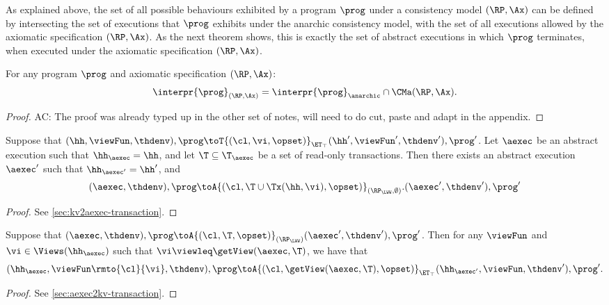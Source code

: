 As explained above, the set of all possible behaviours exhibited by a program $\prog$ under a 
consistency model $(\RP, \Ax)$ can be defined by intersecting the set of executions 
that $\prog$ exhibits under the anarchic consistency model, with the set of all executions 
allowed by the axiomatic specification $(\RP, \Ax)$. As the next theorem shows, 
this is exactly the set of abstract executions in which $\prog$ terminates, 
when executed under the axiomatic specification $(\RP, \Ax)$.

\begin{theorem}
For any program $\prog$ and axiomatic specification $(\RP, \Ax)$:
\[
\interpr{\prog}_{(\RP, \Ax)} = \interpr{\prog}_{\anarchic} \cap \CMa(\RP, \Ax). 
\]
\end{theorem}
\begin{proof}
AC: The proof was already typed up in the other set of notes, will need to do 
cut, paste and adapt in the appendix.
\end{proof}



\begin{proposition}
\label{prop:kv2aexec_transition}
Suppose that $(\hh, \viewFun, \thdenv), \prog \toT{(\cl, \vi, \opset)}_{\ET_{\top}} (\hh', 
\viewFun', \thdenv'), \prog'$. Let $\aexec$ be an abstract execution 
such that $\hh_{\aexec} = \hh$, and let $\T \subseteq \T_{\aexec}$ be a 
set of read-only transactions. Then there exists an abstract execution $\aexec'$ 
such that $\hh_{\aexec'} = \hh'$, and 
\[
(\aexec, \thdenv), \prog \toA{(\cl, \T \cup \Tx(\hh, \vi), \opset)}_{(\RP_{\LWW}, \emptyset)}. 
(\aexec', \thdenv'), \prog'
\]
\end{proposition}
\begin{proof}
See \cref{sec:kv2aexec-transaction}.
\end{proof}

\begin{proposition}
\label{prop:aexec2kv_transition}
Suppose that $(\aexec, \thdenv), \prog \toA{(\cl, \T, \opset)}_{(\RP_{\LWW})} (\aexec', \thdenv'), \prog'$. 
Then for any $\viewFun$ and $\vi \in \Views(\hh_{\aexec})$ such that $\vi \viewleq \getView(\aexec, \T)$, 
we have that 
\[
(\hh_{\aexec}, \viewFun\rmto{\cl}{\vi}, \thdenv), \prog \toA{(\cl, \getView(\aexec, \T), \opset)}_{\ET_{\top}} (\hh_{\aexec'}, \viewFun, \thdenv'), \prog'.
\]
\end{proposition}
\begin{proof}
See \cref{sec:aexec2kv-transaction}.
\end{proof}


